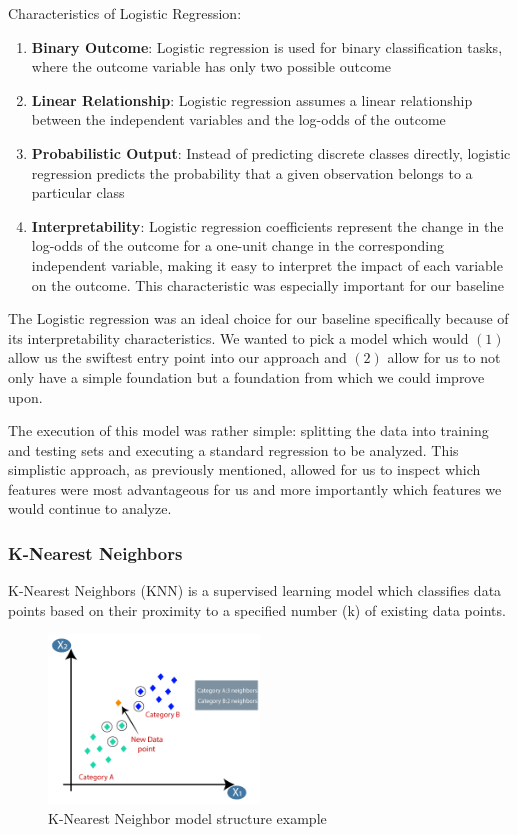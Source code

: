 \documentclass[10pt,sigconf,letterpaper,nonacm]{acmart}
\begin{document}
Characteristics of Logistic Regression:
\begin{enumerate}
  \item \textbf{Binary Outcome}: Logistic regression is used for binary classification tasks, where the outcome variable has only two possible outcome
  \item \textbf{Linear Relationship}: Logistic regression assumes a linear relationship between the independent variables and the log-odds of the outcome
  \item \textbf{Probabilistic Output}: Instead of predicting discrete classes directly, logistic regression predicts the probability that a given observation belongs to a particular class
  \item \textbf{Interpretability}: Logistic regression coefficients represent the change in the log-odds of the outcome for a one-unit change in the corresponding independent variable, making it easy to interpret the impact of each variable on the outcome. This characteristic was especially important for our baseline
\end{enumerate}

The Logistic regression was an ideal choice for our baseline specifically because of its interpretability characteristics. We wanted to pick a model which would $(1)$ allow us the swiftest entry point into our approach and $(2)$ allow for us to not only have a simple foundation but a foundation from which we could improve upon.

The execution of this model was rather simple: splitting the data into training and testing sets and executing a standard regression to be analyzed. This simplistic approach, as previously mentioned, allowed for us to inspect which features were most advantageous for us and more importantly which features we would continue to analyze.


\subsubsection{K-Nearest Neighbors}
K-Nearest Neighbors (KNN) is a supervised learning model which classifies data points
based on their proximity to a specified number (k) of existing data points.
\begin{figure}[htp] 
  \centering
  \includegraphics[width=0.5\textwidth]{Figures_and_Graphs/knnExample.png}
  \caption{K-Nearest Neighbor model structure example}
  \label{fig:ExampleKNN}
\end{figure}
\end{document}
